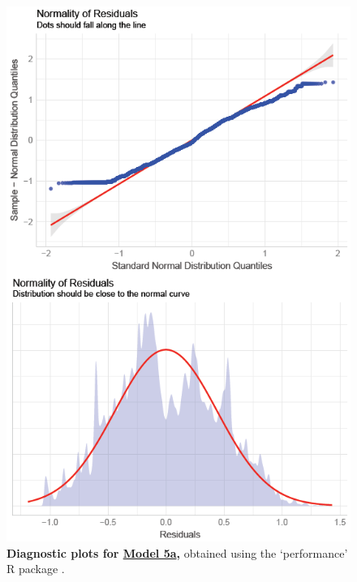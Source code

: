 \begin{figure}[h!]
\centering
\includegraphics[scale=0.8]{Supporting/Chapter3/Figures/Diagnostics/Model5a_diag.png}
\caption[Diagnostic plots for Model 5a]{\textbf{Diagnostic plots for \underline{Model 5a},} obtained using the `performance' R package \citep{performance}.}
\label{SI3_F16}
\end{figure}


